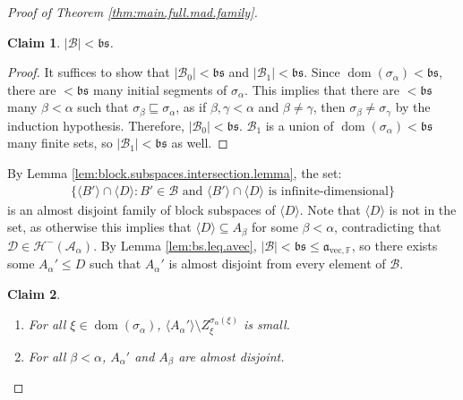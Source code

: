 \documentclass[10pt,a4paper]{amsart}
\theoremstyle{plain}
\numberwithin{equation}{section}
\newtheorem{claim}{Claim}
\theoremstyle{definition}
\newcommand{\func}{\operatorname}
\renewcommand{\c}[1]{\langle #1 \rangle}
\newcommand{\cal}{\mathcal}
\renewcommand{\frak}{\mathfrak}
\newcommand{\dom}{\func{dom}}
\newcommand{\A}{\cal{A}}
\newcommand{\B}{\cal{B}}
\renewcommand{\H}{\cal{H}}
\newcommand{\D}{\cal{D}}
\newcommand{\avec}{\frak{a}_{\mathrm{vec},\mathbb{F}}}
\newenvironment{midproof}[1][Proof]
  {\begin{proof}[#1]\renewcommand{\qedsymbol}{$\blacksquare$}}
  {\end{proof}}
\begin{document}
\begin{proof}[Proof of Theorem \ref{thm:main.full.mad.family}]
    \begin{claim}
    \label{claim:B.smaller.than.bs}
        $|\B| < \frak{bs}$.
    \end{claim}

    \begin{midproof}
        It suffices to show that $|\B_0| < \frak{bs}$ and $|\B_1| < \frak{bs}$. Since $\dom(\sigma_\alpha) < \frak{bs}$, there are $<\frak{bs}$ many initial segments of $\sigma_\alpha$. This implies that there are $<\frak{bs}$ many $\beta < \alpha$ such that $\sigma_\beta \sqsubseteq \sigma_\alpha$, as if $\beta,\gamma < \alpha$ and $\beta \neq \gamma$, then $\sigma_\beta \neq \sigma_\gamma$ by the induction hypothesis. Therefore, $|\B_0| < \frak{bs}$. $\B_1$ is a union of $\dom(\sigma_\alpha) < \frak{bs}$ many finite sets, so $|\B_1| < \frak{bs}$ as well. 
    \end{midproof}

    By Lemma \ref{lem:block.subspaces.intersection.lemma},  the set:
    \begin{align*}
        \{\c{B'} \cap \c{D} : B' \in \B \text{ and } \c{B'} \cap \c{D} \text{ is infinite-dimensional}\}
    \end{align*}
    is an almost disjoint family of block subspaces of $\c{D}$. Note that $\c{D}$ is not in the set, as otherwise this implies that $\c{D} \subseteq A_\beta$ for some $\beta < \alpha$, contradicting that $\D \in \H^-(\A_\alpha)$. By Lemma \ref{lem:bs.leq.avec}, $|\B| < \frak{bs} \leq \avec$, so there exists some $A_\alpha' \leq D$ such that $A_\alpha'$ is almost disjoint from every element of $\B$. 

    \begin{claim}
        \hfill
        \begin{enumerate}
            \item For all $\xi \in \dom(\sigma_\alpha)$, $\c{A_\alpha'} \setminus Z_\xi^{\sigma_\alpha(\xi)}$ is small.

            \item For all $\beta < \alpha$, $A_\alpha'$ and $A_\beta$ are almost disjoint.
        \end{enumerate}
    \end{claim}


\end{proof}
\end{document}
